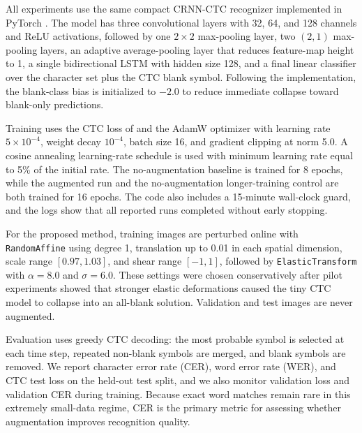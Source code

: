 \documentclass{article} %
\begin{document}
All experiments use the same compact CRNN-CTC recognizer implemented in PyTorch \citep{paszke2019pytorch}. The model has three convolutional layers with 32, 64, and 128 channels and ReLU activations, followed by one \(2 \times 2\) max-pooling layer, two \((2,1)\) max-pooling layers, an adaptive average-pooling layer that reduces feature-map height to 1, a single bidirectional LSTM with hidden size 128, and a final linear classifier over the character set plus the CTC blank symbol. Following the implementation, the blank-class bias is initialized to \(-2.0\) to reduce immediate collapse toward blank-only predictions.

Training uses the CTC loss of \citet{graves2006ctc} and the AdamW optimizer \citep{loshchilov2017adamw} with learning rate \(5 \times 10^{-4}\), weight decay \(10^{-4}\), batch size 16, and gradient clipping at norm 5.0. A cosine annealing learning-rate schedule is used with minimum learning rate equal to 5\% of the initial rate. The no-augmentation baseline is trained for 8 epochs, while the augmented run and the no-augmentation longer-training control are both trained for 16 epochs. The code also includes a 15-minute wall-clock guard, and the logs show that all reported runs completed without early stopping.

For the proposed method, training images are perturbed online with \texttt{RandomAffine} using degree 1, translation up to 0.01 in each spatial dimension, scale range \([0.97, 1.03]\), and shear range \([-1, 1]\), followed by \texttt{ElasticTransform} with \(\alpha = 8.0\) and \(\sigma = 6.0\). These settings were chosen conservatively after pilot experiments showed that stronger elastic deformations caused the tiny CTC model to collapse into an all-blank solution. Validation and test images are never augmented.

Evaluation uses greedy CTC decoding: the most probable symbol is selected at each time step, repeated non-blank symbols are merged, and blank symbols are removed. We report character error rate (CER), word error rate (WER), and CTC test loss on the held-out test split, and we also monitor validation loss and validation CER during training. Because exact word matches remain rare in this extremely small-data regime, CER is the primary metric for assessing whether augmentation improves recognition quality.
\end{document}
